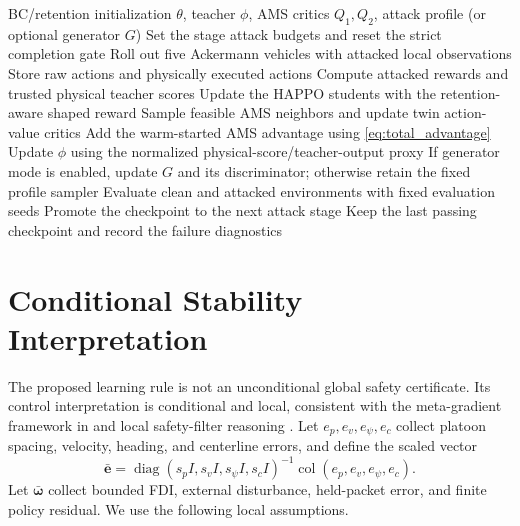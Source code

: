 \documentclass[lettersize,journal]{IEEEtran}
\newcommand{\vect}[1]{\boldsymbol{#1}}
\begin{document}
\begin{algorithm}[t]
\caption{Meta-AMS training under progressive hybrid attacks}
\label{alg:metaams}
\begin{algorithmic}[1]
\Require BC/retention initialization $\theta$, teacher $\phi$, AMS critics $Q_1,Q_2$, attack profile (or optional generator $G$)
  \State Set the stage attack budgets and reset the strict completion gate
    \State Roll out five Ackermann vehicles with attacked local observations
    \State Store raw actions and physically executed actions
    \State Compute attacked rewards and trusted physical teacher scores
    \State Update the HAPPO students with the retention-aware shaped reward
    \State Sample feasible AMS neighbors and update twin action-value critics
    \State Add the warm-started AMS advantage using \eqref{eq:total_advantage}
      \State Update $\phi$ using the normalized physical-score/teacher-output proxy
    \EndIf
    \State If generator mode is enabled, update $G$ and its discriminator; otherwise retain the fixed profile sampler
  \EndFor
  \State Evaluate clean and attacked environments with fixed evaluation seeds
    \State Promote the checkpoint to the next attack stage
  \Else
    \State Keep the last passing checkpoint and record the failure diagnostics
  \EndIf
\EndFor
\end{algorithmic}
\end{algorithm}

\section{Conditional Stability Interpretation}
The proposed learning rule is not an unconditional global safety certificate. Its control interpretation is conditional and local, consistent with the meta-gradient framework in \cite{xia2026security} and local safety-filter reasoning \cite{ames2019control,ghiasi2020resilient}. Let $e_p,e_v,e_\psi,e_c$ collect platoon spacing, velocity, heading, and centerline errors, and define the scaled vector
\begin{equation}
\bar{\vect e}=
\operatorname{diag}(s_p I,s_v I,s_\psi I,s_c I)^{-1}
\operatorname{col}(e_p,e_v,e_\psi,e_c).
\end{equation}
Let $\bar{\vect\omega}$ collect bounded FDI, external disturbance, held-packet error, and finite policy residual. We use the following local assumptions.
\end{document}
